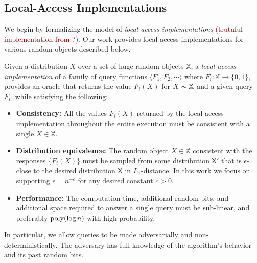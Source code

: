 \subsection{Local-Access Implementations}
We begin by formalizing the model of \emph{local-access implementations} \textcolor{Maroon}{(trutuful implementation from \cite{huge}?)}.
Our work provides local-access implementations for various random objects described below.

\begin{definition}
\label{def:local_access}
Given a distribution $X$ over a set of huge random objects $\mathbb X$, a \emph{local access implementation}
of a family of query functions $\langle F_1, F_2,\cdots \rangle$ where $F_i: \mathbb X\rightarrow \{0,1\}$,
provides an oracle that returns the value $F_i(X)$ for $X\thicksim \mathbb X$ and a given query $F_i$, while satisfying the following:
\begin{itemize}
    \item \textbf{Consistency:}
    All the values $F_i(X)$ returned by the local-access implementation throughout the entire execution
    must be consistent with a single $X\in \mathbb X$.
    \item \textbf{Distribution equivalence:}
    The random object $X\in \mathbb X$ consistent with the responses $\{ F_i(X)\}$ must be sampled from some distribution $\mathsf{X}'$
    that is $\epsilon$-close to the desired distribution $\mathsf{X}$ in $L_1$-distance.
    In this work we focus on supporting $\epsilon = n^{-c}$ for any desired constant $c>0$.
    \item \textbf{Performance:}
    The computation time, additional random bits, and additional space required to answer a single query must be sub-linear,
    and preferably $\mathrm{poly}(\log n)$ with high probability.
\end{itemize}
\end{definition}
In particular, we allow queries to be made adversarially and non-deterministically.
The adversary has full knowledge of the algorithm's behavior and its past random bits.






